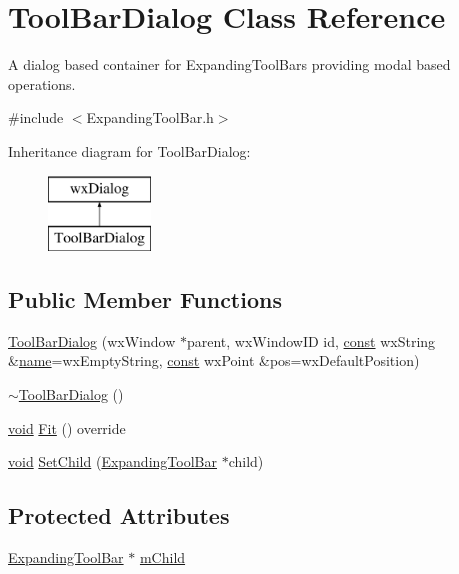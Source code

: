 \hypertarget{class_tool_bar_dialog}{}\section{Tool\+Bar\+Dialog Class Reference}
\label{class_tool_bar_dialog}


A dialog based container for Expanding\+Tool\+Bars providing modal based operations.  




{\ttfamily \#include $<$Expanding\+Tool\+Bar.\+h$>$}

Inheritance diagram for Tool\+Bar\+Dialog\+:\begin{figure}[H]
\begin{center}
\leavevmode
\includegraphics[height=2.000000cm]{class_tool_bar_dialog}
\end{center}
\end{figure}
\subsection*{Public Member Functions}
\begin{DoxyCompactItemize}
\item 
\hyperlink{class_tool_bar_dialog_abe362339518786ae963dd9530e285c2a}{Tool\+Bar\+Dialog} (wx\+Window $\ast$parent, wx\+Window\+ID id, \hyperlink{getopt1_8c_a2c212835823e3c54a8ab6d95c652660e}{const} wx\+String \&\hyperlink{lib_2expat_8h_a1b49b495b59f9e73205b69ad1a2965b0}{name}=wx\+Empty\+String, \hyperlink{getopt1_8c_a2c212835823e3c54a8ab6d95c652660e}{const} wx\+Point \&pos=wx\+Default\+Position)
\item 
\hyperlink{class_tool_bar_dialog_a6da698df45d9f77b54fe83cdc9e8e0e2}{$\sim$\+Tool\+Bar\+Dialog} ()
\item 
\hyperlink{sound_8c_ae35f5844602719cf66324f4de2a658b3}{void} \hyperlink{class_tool_bar_dialog_aa7239d34449b9a2b1efad1fc517f887a}{Fit} () override
\item 
\hyperlink{sound_8c_ae35f5844602719cf66324f4de2a658b3}{void} \hyperlink{class_tool_bar_dialog_ac4c275fd694aa61d8af32850d55d6cc3}{Set\+Child} (\hyperlink{class_expanding_tool_bar}{Expanding\+Tool\+Bar} $\ast$child)
\end{DoxyCompactItemize}
\subsection*{Protected Attributes}
\begin{DoxyCompactItemize}
\item 
\hyperlink{class_expanding_tool_bar}{Expanding\+Tool\+Bar} $\ast$ \hyperlink{class_tool_bar_dialog_ab3fc930f40bf76d7a18158e05fdf2fb3}{m\+Child}
\end{DoxyCompactItemize}


